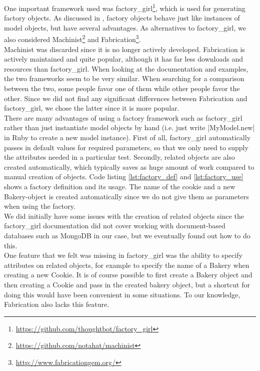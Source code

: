 \MakeShortVerb{\|}

One important framework used was
factory\_girl\footnote{\url{https://github.com/thoughtbot/factory\_girl}},
which is used for generating factory objects. As discussed in
, factory objects behave just like instances of
model objects, but have several advantages. As alternatives to
factory\_girl, we also considered
Machinist\footnote{\url{https://github.com/notahat/machinist}} and
Fabrication\footnote{\url{http://www.fabricationgem.org/}}.\\

Machinist was discarded since it is no longer actively developed.
Fabrication is actively maintained and quite popular, although it has
far less downloads and resources than factory\_girl. When looking at the
documentation and examples, the two frameworks seem to be very similar.
When searching for a comparison between the two, some people favor one
of them while other people favor the other. Since we did not find any
significant differences between Fabrication and factory\_girl, we chose
the latter since it is more popular.\\

There are many advantages of using a factory framework such as
factory\_girl rather than just instantiate model objects by hand (i.e.
just write |MyModel.new| in Ruby to create a new model instance). First
of all, factory\_girl automatically passes in default values for
required parameters, so that we only need to supply the attributes
needed in a particular test. Secondly, related objects are also created
automatically, which typically saves as huge amount of work compared to
manual creation of objects. Code listing \ref{lst:factory_def} and
\ref{lst:factory_use} shows a factory definition and its usage. The name
of the cookie and a new Bakery-object is created automatically since we
do not give them as parameters when using the factory.\\

We did initially have some issues with the creation of related objects
since the factory\_girl documentation did not cover working with
document-based databases such as MongoDB in our case, but we eventually
found out how to do this.\\

One feature that we felt was missing in factory\_girl was the ability to
specify attributes on related objects, for example to specify the name
of a Bakery when creating a new Cookie. It is of course possible to
first create a Bakery object and then creating a Cookie and pass in the
created bakery object, but a shortcut for doing this would have been
convenient in some situations. To our knowledge, Fabrication also lacks
this feature.\\

